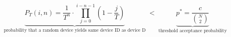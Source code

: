 \documentclass{standalone}
\begin{document}
\centering
\begin{minipage}{13cm}
	\[
		\underbrace{
			P_T(i, n)
			=
			\frac{1}{T^n}
			\cdot
			\prod_{j=0}^{i - n - 1}
			\left(1 - \frac{j}{T}\right)
		}_{\text{probability that a random device yields same device ID as device D}}
		\;<\;
		\underbrace{
			p^* = \frac{c}{\binom{N}{2}}
		}_{\text{threshold acceptance probability}}
	\]
\end{minipage}
\end{document}
